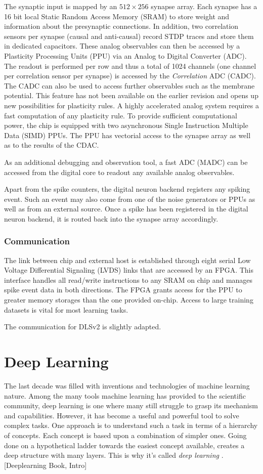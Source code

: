 The synaptic input is mapped by an $512 \times 256$ synapse array. Each synapse has a 16 bit local Static Random Access Memory (SRAM) to store weight and information about the presynaptic connections. In addition, two correlation sensors per synapse (causal and anti-causal) record STDP traces and store them in dedicated capacitors. These analog observables can then be accessed by a Plasticity Processing Units (PPU) via an Analog to Digital Converter (ADC). The readout is performed per row and thus a total of 1024 channels (one channel per correlation sensor per synapse) is accessed by the \textit{Correlation} ADC (CADC). The CADC can also be used to access further observables such as the membrane potential. This feature has not been available on the earlier revision and opens up new possibilities for plasticity rules. A highly accelerated analog system requires a fast computation of any plasticity rule. To provide sufficient computational power, the chip is equipped with two asynchronous Single Instruction Multiple Data (SIMD) PPUs. The PPU has vectorial access to the synapse array as well as to the results of the CDAC.   

As an additional debugging and observation tool, a fast ADC (MADC) can be accessed from the digital core to readout any available analog observables.

Apart from the spike counters, the digital neuron backend registers any spiking event. Such an event may also come from one of the noise generators or PPUs as well as from an external source. Once a spike has been registered in the digital neuron backend, it is routed back into the synapse array accordingly. 

\subsubsection{Communication}
The link between chip and external host is established through eight serial Low Voltage Differential Signaling (LVDS) links that are accessed by an FPGA. This interface handles all read/write instructions to any SRAM on chip and manages spike event data in both directions. The FPGA grants access for the PPU to greater memory storages than the one provided on-chip. Access to large training datasets is vital for most learning tasks.

The communication for DLSv2 is slightly adapted. 

\section{Deep Learning}
\label{deeplearning}
The last decade was filled with inventions and technologies of machine learning nature. Among the many tools machine learning has provided to the scientific community, deep learning is one where many still struggle to grasp its mechanism and capabilities. However, it has become a useful and powerful tool to solve complex tasks. One approach is to understand such a task in terms of a hierarchy of concepts. Each concept is based upon a combination of simpler ones. Going done on a hypothetical ladder towards the easiest concept available, creates a deep structure with many layers. This is why it's called \textit{deep learning} . [Deeplearning Book, Intro]

